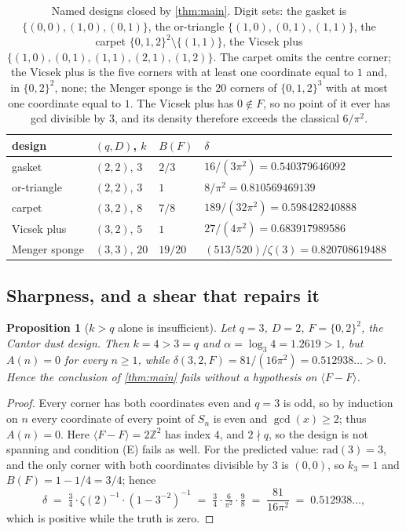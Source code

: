 \documentclass[11pt]{amsart}
\newtheorem{proposition}[theorem]{Proposition}
\theoremstyle{definition}
\theoremstyle{remark}
\begin{document}
\begin{table}[ht]
\centering
\small
\begin{tabular}{llll}
\toprule
design & $(q,D)$, $k$ & $B(F)$ & $\delta$ \\
\midrule
gasket & $(2,2)$, $3$ & $2/3$ & $16/(3\pi^{2}) = 0.540379646092$ \\
or-triangle & $(2,2)$, $3$ & $1$ & $8/\pi^{2} = 0.810569469139$ \\
carpet & $(3,2)$, $8$ & $7/8$ & $189/(32\pi^{2}) = 0.598428240888$ \\
Vicsek plus & $(3,2)$, $5$ & $1$ & $27/(4\pi^{2}) = 0.683917989586$ \\
Menger sponge & $(3,3)$, $20$ & $19/20$ & $(513/520)/\zeta(3) = 0.820708619488$ \\
\bottomrule
\end{tabular}
\caption{Named designs closed by \cref{thm:main}. Digit sets: the gasket is $\{(0,0),(1,0),(0,1)\}$, the or-triangle $\{(1,0),(0,1),(1,1)\}$, the carpet $\{0,1,2\}^{2}\setminus\{(1,1)\}$, the Vicsek plus $\{(1,0),(0,1),(1,1),(2,1),(1,2)\}$. The carpet omits the centre corner; the Vicsek plus is the five corners with at least one coordinate equal to $1$ and, in $\{0,2\}^2$, none; the Menger sponge is the $20$ corners of $\{0,1,2\}^{3}$ with at most one coordinate equal to $1$. The Vicsek plus has $0 \notin F$, so no point of it ever has gcd divisible by $3$, and its density therefore exceeds the classical $6/\pi^{2}$.}
\label{tab:constants}
\end{table}

\subsection{Sharpness, and a shear that repairs it}

\begin{proposition}[$k>q$ alone is insufficient]
\label{prop:sharp}
Let $q=3$, $D=2$, $F = \{0,2\}^{2}$, the Cantor dust design. Then $k = 4 > 3 = q$ and $\alpha = \log_3 4 = 1.2619 > 1$, but $A(n) = 0$ for every $n \ge 1$, while $\delta(3,2,F) = 81/(16\pi^{2}) = 0.512938\ldots > 0$. Hence the conclusion of \cref{thm:main} fails without a hypothesis on $\langle F-F\rangle$.
\end{proposition}

\begin{proof}
Every corner has both coordinates even and $q=3$ is odd, so by induction on $n$ every coordinate of every point of $S_n$ is even and $\gcd(x) \ge 2$; thus $A(n)=0$. Here $\langle F-F\rangle = 2\mathbb{Z}^{2}$ has index $4$, and $2 \nmid q$, so the design is not spanning and condition (E) fails as well. For the predicted value: $\mathrm{rad}(3)=3$, and the only corner with both coordinates divisible by $3$ is $(0,0)$, so $k_3 = 1$ and $B(F) = 1 - 1/4 = 3/4$; hence
\[
  \delta \;=\; \tfrac34 \cdot \zeta(2)^{-1} \cdot (1-3^{-2})^{-1}
  \;=\; \tfrac34\cdot\tfrac{6}{\pi^{2}}\cdot\tfrac98 \;=\; \frac{81}{16\pi^{2}} \;=\; 0.512938\ldots,
\]
which is positive while the truth is zero.
\end{proof}
\end{document}
